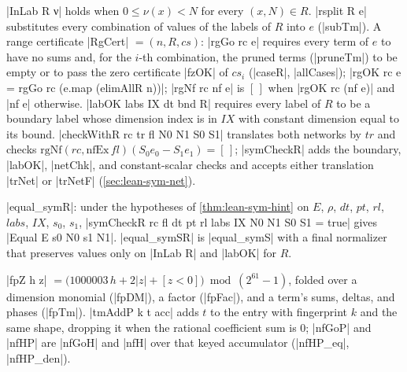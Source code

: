 \begin{definition}\label{def:lean-sym-rgcert}
\lean|InLab R ν| holds when $0\le\nu(x)<N$ for every $(x,N)\in R$. \lean|rsplit R e| substitutes every combination of values of the labels of $R$ into $e$ (\lean|subTm|). A range certificate \lean|RgCert| $=(n,R,cs)$: \lean|rgGo rc e| requires every term of $e$ to have no sums and, for the $i$-th combination, the pruned terms (\lean|pruneTm|) to be empty or to pass the zero certificate \lean|fzOK| of $cs_i$ (\lean|caseR|, \lean|allCases|); \lean|rgOK rc e = rgGo rc (e.map (elimAllR n))|; \lean|rgNf rc nf e| is $[\,]$ when \lean|rgOK rc (nf e)| and \lean|nf e| otherwise. \lean|labOK labs IX dt bnd R| requires every label of $R$ to be a boundary label whose dimension index is in $IX$ with constant dimension equal to its bound. \lean|checkWithR rc tr fl N0 N1 S0 S1| translates both networks by $tr$ and checks $\mathrm{rgNf}(rc,\mathrm{nfEx}\,fl)(S_0e_0-S_1e_1)=[\,]$; \lean|symCheckR| adds the boundary, \lean|labOK|, \lean|netChk|, and constant-scalar checks and accepts either translation \lean|trNet| or \lean|trNetF| (\cref{sec:lean-sym-net}).
\end{definition}

\begin{theorem}\label{thm:lean-sym-equal-symR}
\lean|equal_symR|: under the hypotheses of \cref{thm:lean-sym-hint} on $E$, $\rho$, $dt$, $pt$, $rl$, $labs$, $IX$, $s_0$, $s_1$, \lean|symCheckR rc fl dt pt rl labs IX N0 N1 S0 S1 = true| gives \lean|Equal E s0 N0 s1 N1|. \lean|equal_symSR| is \lean|equal_symS| with a final normalizer that preserves values only on \lean|InLab R| and \lean|labOK| for $R$.
\end{theorem}

\begin{definition}\label{def:lean-sym-fp}
\lean|fpZ h z| $=\bigl(1000003\,h+2|z|+[z<0]\bigr)\bmod(2^{61}-1)$, folded over a dimension monomial (\lean|fpDM|), a factor (\lean|fpFac|), and a term's sums, deltas, and phases (\lean|fpTm|). \lean|tmAddP k t acc| adds $t$ to the entry with fingerprint $k$ and the same shape, dropping it when the rational coefficient sum is $0$; \lean|nfGoP| and \lean|nfHP| are \lean|nfGoH| and \lean|nfH| over that keyed accumulator (\lean|nfHP_eq|, \lean|nfHP_den|).
\end{definition}

